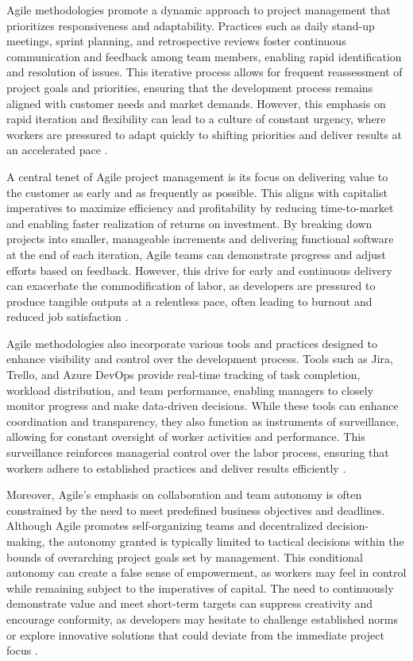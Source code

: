 \begin{refsection}
Agile methodologies promote a dynamic approach to project management that prioritizes responsiveness and adaptability. Practices such as daily stand-up meetings, sprint planning, and retrospective reviews foster continuous communication and feedback among team members, enabling rapid identification and resolution of issues. This iterative process allows for frequent reassessment of project goals and priorities, ensuring that the development process remains aligned with customer needs and market demands. However, this emphasis on rapid iteration and flexibility can lead to a culture of constant urgency, where workers are pressured to adapt quickly to shifting priorities and deliver results at an accelerated pace \cite[pp.~45-48]{Highsmith2002AgileEcosystems}.

A central tenet of Agile project management is its focus on delivering value to the customer as early and as frequently as possible. This aligns with capitalist imperatives to maximize efficiency and profitability by reducing time-to-market and enabling faster realization of returns on investment. By breaking down projects into smaller, manageable increments and delivering functional software at the end of each iteration, Agile teams can demonstrate progress and adjust efforts based on feedback. However, this drive for early and continuous delivery can exacerbate the commodification of labor, as developers are pressured to produce tangible outputs at a relentless pace, often leading to burnout and reduced job satisfaction \cite[pp.~127-130]{Cockburn2007AgileDevelopment}.

Agile methodologies also incorporate various tools and practices designed to enhance visibility and control over the development process. Tools such as Jira, Trello, and Azure DevOps provide real-time tracking of task completion, workload distribution, and team performance, enabling managers to closely monitor progress and make data-driven decisions. While these tools can enhance coordination and transparency, they also function as instruments of surveillance, allowing for constant oversight of worker activities and performance. This surveillance reinforces managerial control over the labor process, ensuring that workers adhere to established practices and deliver results efficiently \cite[pp.~143-146]{Sutherland2021Scrum}.

Moreover, Agile's emphasis on collaboration and team autonomy is often constrained by the need to meet predefined business objectives and deadlines. Although Agile promotes self-organizing teams and decentralized decision-making, the autonomy granted is typically limited to tactical decisions within the bounds of overarching project goals set by management. This conditional autonomy can create a false sense of empowerment, as workers may feel in control while remaining subject to the imperatives of capital. The need to continuously demonstrate value and meet short-term targets can suppress creativity and encourage conformity, as developers may hesitate to challenge established norms or explore innovative solutions that could deviate from the immediate project focus \cite[pp.~87-89]{Beck1999ExtremeProgramming}.


\end{refsection}
